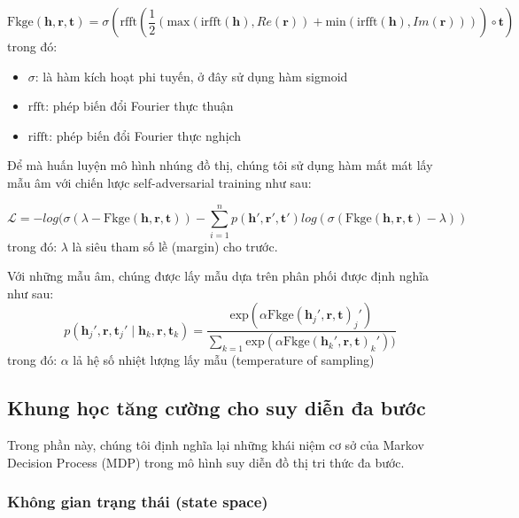 \begin{equation}
    \text{Fkge}(\mathbf{h}, \mathbf{r}, \mathbf{t}) = \sigma(\text{rfft}\left(\frac{1}{2}\left(\text{max}(\text{irfft}(\mathbf{h}), Re(\mathbf{r})) + \text{min}(\text{irfft}(\mathbf{h}), Im(\mathbf{r}))\right)\right) \circ \mathbf{t})
\end{equation}
trong đó:
\begin{itemize}
    \item $\sigma$: là hàm kích hoạt phi tuyến, ở đây sử dụng hàm sigmoid
    \item $\text{rfft}$: phép biến đổi Fourier thực thuận
    \item $\text{rifft}$: phép biến đổi Fourier thực nghịch
\end{itemize}

Để mà huấn luyện mô hình nhúng đồ thị, chúng tôi sử dụng hàm mất mát lấy mẫu âm với chiến lược self-adversarial training\cite{sun2019rotate} như sau:

\begin{equation}
    \mathcal{L} = -log(\sigma(\lambda - \text{Fkge}(\mathbf{h}, \mathbf{r}, \mathbf{t})) - \sum_{i=1}^np(\mathbf{h}', \mathbf{r}', \mathbf{t}')log(\sigma(\text{Fkge}(\mathbf{h}, \mathbf{r}, \mathbf{t}) - \lambda))
\end{equation}
trong đó: $\lambda$ là siêu tham số lề (margin) cho trước.

Với những mẫu âm, chúng được lấy mẫu dựa trên phân phối được định nghĩa như sau:
\begin{equation}
    p(\mathbf{h}_j', \mathbf{r}, \mathbf{t}_j' \mid \mathbf{h}_k, \mathbf{r}, \mathbf{t}_k) = \frac{\text{exp}(\alpha\text{Fkge}(\mathbf{h}_j', \mathbf{r}, \mathbf{t})_j')}{\sum_{k=1}\text{exp}(\alpha\text{Fkge}(\mathbf{h}_k', \mathbf{r}, \mathbf{t})_k'))}
\end{equation}
trong đó: $\alpha$ lả hệ số nhiệt lượng lấy mẫu (temperature of sampling)


\subsection{Khung học tăng cường cho suy diễn đa bước}

Trong phần này, chúng tôi định nghĩa lại những khái niệm cơ sở của Markov Decision Process (MDP) trong mô hình suy diễn đồ thị tri thức đa bước.

\subsubsection{Không gian trạng thái (state space)}

